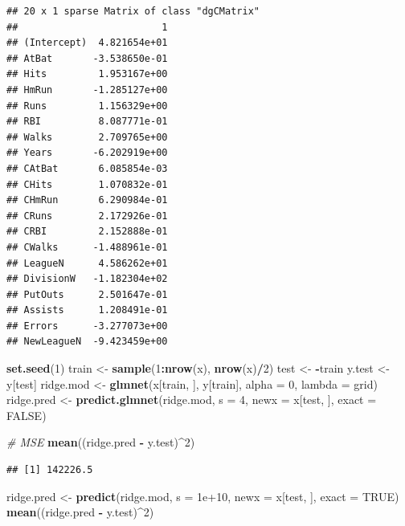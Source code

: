 \documentclass[
  12pt,
]{book}
\newenvironment{Shaded}{\begin{snugshade}}{\end{snugshade}}
\newcommand{\CommentTok}[1]{\textcolor[rgb]{0.56,0.35,0.01}{\textit{#1}}}
\newcommand{\DataTypeTok}[1]{\textcolor[rgb]{0.13,0.29,0.53}{#1}}
\newcommand{\DecValTok}[1]{\textcolor[rgb]{0.00,0.00,0.81}{#1}}
\newcommand{\FloatTok}[1]{\textcolor[rgb]{0.00,0.00,0.81}{#1}}
\newcommand{\KeywordTok}[1]{\textcolor[rgb]{0.13,0.29,0.53}{\textbf{#1}}}
\newcommand{\NormalTok}[1]{#1}
\newcommand{\OperatorTok}[1]{\textcolor[rgb]{0.81,0.36,0.00}{\textbf{#1}}}
\newcommand{\OtherTok}[1]{\textcolor[rgb]{0.56,0.35,0.01}{#1}}
\newcommand{\StringTok}[1]{\textcolor[rgb]{0.31,0.60,0.02}{#1}}
\theoremstyle{definition}
\theoremstyle{definition}
\theoremstyle{definition}
\theoremstyle{remark}
\begin{document}
\begin{verbatim}
## 20 x 1 sparse Matrix of class "dgCMatrix"
##                         1
## (Intercept)  4.821654e+01
## AtBat       -3.538650e-01
## Hits         1.953167e+00
## HmRun       -1.285127e+00
## Runs         1.156329e+00
## RBI          8.087771e-01
## Walks        2.709765e+00
## Years       -6.202919e+00
## CAtBat       6.085854e-03
## CHits        1.070832e-01
## CHmRun       6.290984e-01
## CRuns        2.172926e-01
## CRBI         2.152888e-01
## CWalks      -1.488961e-01
## LeagueN      4.586262e+01
## DivisionW   -1.182304e+02
## PutOuts      2.501647e-01
## Assists      1.208491e-01
## Errors      -3.277073e+00
## NewLeagueN  -9.423459e+00
\end{verbatim}

\begin{Shaded}
\begin{Highlighting}[]
\KeywordTok{set.seed}\NormalTok{(}\DecValTok{1}\NormalTok{)}
\NormalTok{train <-}\StringTok{ }\KeywordTok{sample}\NormalTok{(}\DecValTok{1}\OperatorTok{:}\KeywordTok{nrow}\NormalTok{(x), }\KeywordTok{nrow}\NormalTok{(x)}\OperatorTok{/}\DecValTok{2}\NormalTok{)}
\NormalTok{test <-}\StringTok{ }\OperatorTok{-}\NormalTok{train}
\NormalTok{y.test <-}\StringTok{ }\NormalTok{y[test]}
\NormalTok{ridge.mod <-}\StringTok{ }\KeywordTok{glmnet}\NormalTok{(x[train, ], y[train], }\DataTypeTok{alpha =} \DecValTok{0}\NormalTok{, }
    \DataTypeTok{lambda =}\NormalTok{ grid)}
\NormalTok{ridge.pred <-}\StringTok{ }\KeywordTok{predict.glmnet}\NormalTok{(ridge.mod, }\DataTypeTok{s =} \DecValTok{4}\NormalTok{, }\DataTypeTok{newx =}\NormalTok{ x[test, }
\NormalTok{    ], }\DataTypeTok{exact =} \OtherTok{FALSE}\NormalTok{)}
\end{Highlighting}
\end{Shaded}

\begin{Shaded}
\begin{Highlighting}[]
\CommentTok{# MSE}
\KeywordTok{mean}\NormalTok{((ridge.pred }\OperatorTok{-}\StringTok{ }\NormalTok{y.test)}\OperatorTok{^}\DecValTok{2}\NormalTok{)}
\end{Highlighting}
\end{Shaded}

\begin{verbatim}
## [1] 142226.5
\end{verbatim}

\begin{Shaded}
\begin{Highlighting}[]
\NormalTok{ridge.pred <-}\StringTok{ }\KeywordTok{predict}\NormalTok{(ridge.mod, }\DataTypeTok{s =} \FloatTok{1e+10}\NormalTok{, }\DataTypeTok{newx =}\NormalTok{ x[test, }
\NormalTok{    ], }\DataTypeTok{exact =} \OtherTok{TRUE}\NormalTok{)}
\KeywordTok{mean}\NormalTok{((ridge.pred }\OperatorTok{-}\StringTok{ }\NormalTok{y.test)}\OperatorTok{^}\DecValTok{2}\NormalTok{)}
\end{Highlighting}
\end{Shaded}
\end{document}
